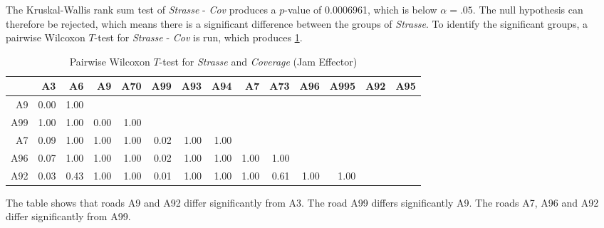 The Kruskal-Wallis rank sum test of \textit{Strasse} - \textit{Cov} produces a $p$-value of 0.0006961, which is below $\alpha=.05$. The null hypothesis can therefore be rejected, which means there is a significant difference between the groups of \textit{Strasse}. To identify the significant groups, a pairwise Wilcoxon $T$-test for \textit{Strasse} - \textit{Cov} is run, which produces \cref{tbl:wilcoxon_baysis_effector_Strasse_Cov}. 
\begin{table}[ht]
	\tiny
	\centering
	\begin{tabular}{rrrrrrrrrrrrrr}
		\toprule
			 & A3 & A6 & A9 & A70 & A99 & A93 & A94 & A7 & A73 & A96 & A995 & A92 & A95 \\ 
		\midrule
		A9   & 0.00 & 1.00 &  &  &  &  &  &  &  &  &  &  &  \\ 
		A99  & 1.00 & 1.00 & 0.00 & 1.00 &  &  &  &  &  &  &  &  &  \\ 
		A7   & 0.09 & 1.00 & 1.00 & 1.00 & 0.02 & 1.00 & 1.00 &  &  &  &  &  &  \\ 
		A96  & 0.07 & 1.00 & 1.00 & 1.00 & 0.02 & 1.00 & 1.00 & 1.00 & 1.00 &  &  &  &  \\ 
		A92  & 0.03 & 0.43 & 1.00 & 1.00 & 0.01 & 1.00 & 1.00 & 1.00 & 0.61 & 1.00 & 1.00 &  &  \\ 
		\bottomrule
	  \end{tabular}
    \caption{Pairwise Wilcoxon $T$-test for \textit{Strasse} and \textit{Coverage} (Jam Effector)}
    \label{tbl:wilcoxon_baysis_effector_Strasse_Cov}
\end{table}
The table shows that roads A9 and A92 differ significantly from A3. The road A99 differs significantly A9. The roads A7, A96 and A92 differ significantly from A99.
